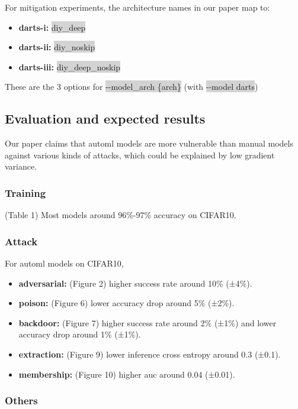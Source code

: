 \documentclass[letterpaper,twocolumn,10pt]{article}
\begin{document}
{{{{For mitigation experiments, the architecture names in our paper map to:

{\small
\begin{itemize}
    \item {\bf darts-i: } \colorbox{lightgray}{diy\_deep}
    \item {\bf darts-ii: } \colorbox{lightgray}{diy\_noskip}
    \item {\bf darts-iii: } \colorbox{lightgray}{diy\_deep\_noskip}
\end{itemize}

These are the 3 options for \colorbox{lightgray}{-{}-model\_arch \{arch\}} (with \colorbox{lightgray}{-{}-model darts})

\subsection{Evaluation and expected results}

Our paper claims that automl models are more vulnerable than manual models against various kinds of attacks, which could be explained by low gradient variance. 
\subsubsection*{Training}
(Table 1) Most models around 96\%-97\% accuracy on CIFAR10.
\subsubsection*{Attack}
For automl models on CIFAR10,

{\small
\begin{itemize}
    \item {\bf adversarial: } (Figure 2) higher success rate around 10\% (±4\%).
    \item {\bf poison: } (Figure 6) lower accuracy drop around 5\% (±2\%).
    \item {\bf backdoor: } (Figure 7) higher success rate around 2\% (±1\%) and lower accuracy drop around 1\% (±1\%).
    \item {\bf extraction: } (Figure 9) lower inference cross entropy around 0.3 (±0.1).
    \item {\bf membership: } (Figure 10) higher auc around 0.04 (±0.01).
\end{itemize}

\subsubsection*{Others}

}}}}}}
\end{document}
